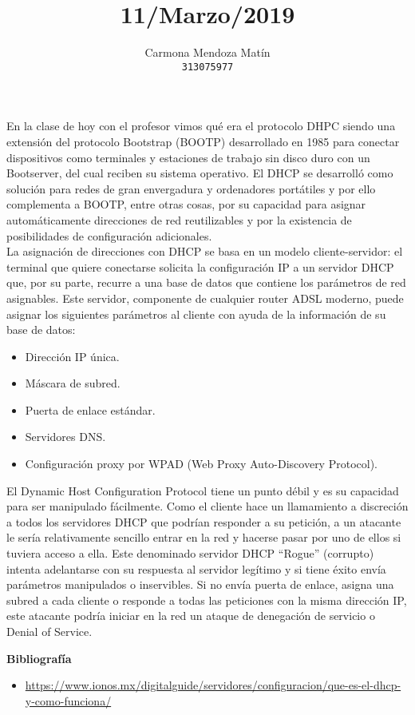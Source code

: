 \documentclass[11pt, a4paper]{report}
\begin{document}
\title{11/Marzo/2019}
\author{
  Carmona Mendoza Mat\'in\\
  \texttt{313075977}
}
\date{}
\maketitle

En la clase de hoy con el profesor vimos qué era el protocolo DHPC siendo una
extensión del protocolo Bootstrap (BOOTP) desarrollado en 1985 para conectar
dispositivos como terminales y estaciones de trabajo sin disco duro con un
Bootserver, del cual reciben su sistema operativo. El DHCP se desarrolló como
solución para redes de gran envergadura y ordenadores portátiles y por ello
complementa a BOOTP, entre otras cosas, por su capacidad para asignar
automáticamente direcciones de red reutilizables y por la existencia de
posibilidades de configuración adicionales. \\

La asignación de direcciones con DHCP se basa en un modelo cliente-servidor: el
terminal que quiere conectarse solicita la configuración IP a un servidor DHCP
que, por su parte, recurre a una base de datos que contiene los parámetros de
red asignables. Este servidor, componente de cualquier router ADSL moderno,
puede asignar los siguientes parámetros al cliente con ayuda de la información
de su base de datos:

\begin{itemize}
\item Dirección IP única.
\item Máscara de subred.
\item Puerta de enlace estándar.
\item Servidores DNS.
\item Configuración proxy por WPAD (Web Proxy Auto-Discovery Protocol).
\end{itemize}

El Dynamic Host Configuration Protocol tiene un punto débil y es su capacidad
para ser manipulado fácilmente. Como el cliente hace un llamamiento a
discreción a todos los servidores DHCP que podrían responder a su petición, a
un atacante le sería relativamente sencillo entrar en la red y hacerse pasar
por uno de ellos si tuviera acceso a ella. Este denominado servidor DHCP
“Rogue” (corrupto) intenta adelantarse con su respuesta al servidor legítimo y
si tiene éxito envía parámetros manipulados o inservibles. Si no envía puerta
de enlace, asigna una subred a cada cliente o responde a todas las peticiones
con la misma dirección IP, este atacante podría iniciar en la red un ataque de
denegación de servicio o Denial of Service.

\newpage

\textbf{Bibliografía} \\

\begin{itemize}

\item \url{https://www.ionos.mx/digitalguide/servidores/configuracion/que-es-el-dhcp-y-como-funciona/}

\end{itemize}
\end{document}
